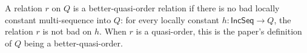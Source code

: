 \begin{definition}
A relation $r$ on $Q$ is a better-quasi-order relation if there is no bad
locally constant multi-sequence into $Q$: for every locally constant
$h:\mathsf{IncSeq}\to Q$, the relation $r$ is not bad on $h$.
When $r$ is a quasi-order, this is the paper's definition of $Q$ being a
better-quasi-order.
\end{definition}
